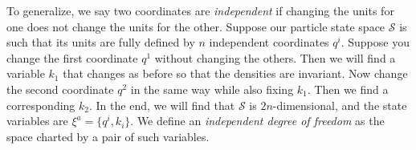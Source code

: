 \documentclass[letterpaper]{article}
\begin{document}

To generalize, we say two coordinates are \textit{independent} if changing the units for one does not change the units for the other. Suppose our particle state space $\mathcal{S}$ is such that its units are fully defined by $n$ independent coordinates $q^i$. Suppose you change the first coordinate $q^1$ without changing the others. Then we will find a variable $k_1$ that changes as before so that the densities are invariant. Now change the second coordinate $q^2$ in the same way while also fixing $k_1$. Then we find a corresponding $k_2$. In the end, we will find that $\mathcal{S}$ is $2n$-dimensional, and the state variables are $\xi^a = \{ q^i, k_i \}$. We define an \textit{independent degree of freedom} as the space charted by a pair of such variables.
\end{document}
